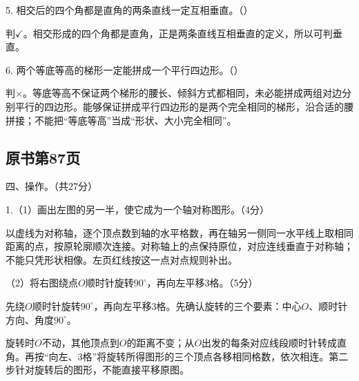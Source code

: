 5. 相交后的四个角都是直角的两条直线一定互相垂直。（\hspace{1.8em}）\par
\begin{BookAnswer}
判\(\checkmark\)。相交形成的四个角都是直角，正是两条直线互相垂直的定义，所以可判垂直。
\end{BookAnswer}

6. 两个等底等高的梯形一定能拼成一个平行四边形。（\hspace{1.8em}）\par
\begin{BookAnswer}
判\(\times\)。等底等高不保证两个梯形的腰长、倾斜方式都相同，未必能拼成两组对边分别平行的四边形。能够保证拼成平行四边形的是两个完全相同的梯形，沿合适的腰拼接；不能把“等底等高”当成“形状、大小完全相同”。
\end{BookAnswer}



\subsection*{原书第87页}

四、操作。（共27分）\par 1.（1）画出左图的另一半，使它成为一个轴对称图形。（4分）\par
{}
\begin{BookAnswer}
以虚线为对称轴，逐个顶点数到轴的水平格数，再在轴另一侧同一水平线上取相同距离的点，按原轮廓顺次连接。对称轴上的点保持原位，对应连线垂直于对称轴；不能只凭形状相像。左页红线按这一点对点规则补出。
\end{BookAnswer}

（2）将右图绕点\(O\)顺时针旋转\(90^\circ\)，再向左平移\(3\)格。（5分）\par
{}
\begin{BookAnswer}
先绕\(O\)顺时针旋转\(90^\circ\)，再向左平移\(3\)格。先确认旋转的三个要素：中心\(O\)、顺时针方向、角度\(90^\circ\)。\par 旋转时\(O\)不动，其他顶点到\(O\)的距离不变；从\(O\)出发的每条对应线段顺时针转成直角。再按“向左、\(3\)格”将旋转所得图形的三个顶点各移相同格数，依次相连。第二步针对旋转后的图形，不能直接平移原图。
\end{BookAnswer}

